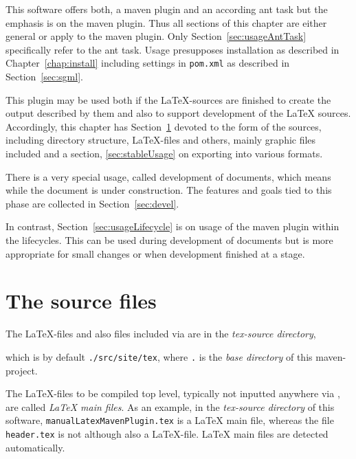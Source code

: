 \documentclass[12pt]{book}
\renewcommand{\index}[1]{ }
\begin{document}
This software offers both, a maven plugin and an according ant task
but the emphasis is on the maven plugin.
Thus all sections of this chapter are either general
or apply to the maven plugin.
Only Section~\ref{sec:usageAntTask} specifically refer to the ant task. 
Usage presupposes installation as described in Chapter~\ref{chap:install}
including settings in \texttt{pom.xml}
as described in Section~\ref{sec:sgml}.

This plugin may be used both if the \LaTeX-sources are finished 
to create the output described by them 
and also to support development of the \LaTeX{} sources. 
Accordingly, this chapter has Section~\ref{sec:sources}
devoted to the form of the sources, including directory structure,
\LaTeX-files and others, mainly graphic files included
and a section, \ref{sec:stableUsage} on exporting into various formats.

There is a very special usage, called development of documents,
which means while the document is under construction.
The features and goals tied to this phase
are collected in Section~\ref{sec:devel}.

In contrast, Section~\ref{sec:usageLifecycle}
is on usage of the maven plugin within the lifecycles.
This can be used during development of documents
but is more appropriate for small changes
or when development finished at a stage. 



\section{The source files}\label{sec:sources}

The \LaTeX-files and also files included via  
are in the {\em tex-source directory}, 
\index{tex-source directory}
which is by default \texttt{./src/site/tex}, 
where \texttt{.} is the {\em base directory\/} of this maven-project. 
\index{base directory}
The \LaTeX-files to be compiled top level, 
typically not inputted anywhere via , 
are called {\em \LaTeX{} main files}. 
As an example, 
in the {\em tex-source directory\/} of this software, 
\texttt{manualLatexMavenPlugin.tex} is a \LaTeX{} main file, 
whereas the file \texttt{header.tex} is not although also a \LaTeX-file. 
\LaTeX{} main files are detected automatically. 
\index{latex main file}
\end{document}
